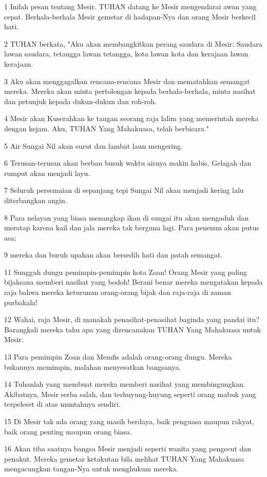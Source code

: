 \par 1 Inilah pesan tentang Mesir. TUHAN datang ke Mesir mengendarai awan yang cepat. Berhala-berhala Mesir gemetar di hadapan-Nya dan orang Mesir berkecil hati.
\par 2 TUHAN berkata, "Aku akan membangkitkan perang saudara di Mesir: Saudara lawan saudara, tetangga lawan tetangga, kota lawan kota dan kerajaan lawan kerajaan.
\par 3 Aku akan menggagalkan rencana-rencana Mesir dan mematahkan semangat mereka. Mereka akan minta pertolongan kepada berhala-berhala, minta nasihat dan petunjuk kepada dukun-dukun dan roh-roh.
\par 4 Mesir akan Kuserahkan ke tangan seorang raja lalim yang memerintah mereka dengan kejam. Aku, TUHAN Yang Mahakuasa, telah berbicara."
\par 5 Air Sungai Nil akan surut dan lambat laun mengering.
\par 6 Terusan-terusan akan berbau busuk waktu airnya makin habis. Gelagah dan rumput akan menjadi layu.
\par 7 Seluruh persemaian di sepanjang tepi Sungai Nil akan menjadi kering lalu diterbangkan angin.
\par 8 Para nelayan yang biasa menangkap ikan di sungai itu akan mengaduh dan meratap karena kail dan jala mereka tak berguna lagi. Para penenun akan putus asa;
\par 9 mereka dan buruh upahan akan bersedih hati dan patah semangat.
\par 11 Sungguh dungu pemimpin-pemimpin kota Zoan! Orang Mesir yang paling bijaksana memberi nasihat yang bodoh! Berani benar mereka mengatakan kepada raja bahwa mereka keturunan orang-orang bijak dan raja-raja di zaman purbakala!
\par 12 Wahai, raja Mesir, di manakah penasihat-penasihat baginda yang pandai itu? Barangkali mereka tahu apa yang direncanakan TUHAN Yang Mahakuasa untuk Mesir.
\par 13 Para pemimpin Zoan dan Memfis adalah orang-orang dungu. Mereka bukannya memimpin, malahan menyesatkan bangsanya.
\par 14 Tuhanlah yang membuat mereka memberi nasihat yang membingungkan. Akibatnya, Mesir serba salah, dan terhuyung-huyung seperti orang mabuk yang terpeleset di atas muntahnya sendiri.
\par 15 Di Mesir tak ada orang yang masih berdaya, baik penguasa maupun rakyat, baik orang penting maupun orang biasa.
\par 16 Akan tiba saatnya bangsa Mesir menjadi seperti wanita yang pengecut dan penakut. Mereka gemetar ketakutan bila melihat TUHAN Yang Mahakuasa mengacungkan tangan-Nya untuk menghukum mereka.
